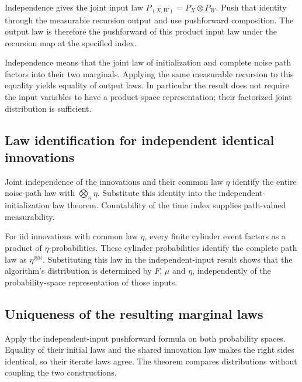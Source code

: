 \documentclass[11pt,a4paper]{report}
\begin{document}
Independence gives the joint input law \(P_{(X,W)}=P_X\otimes P_W\). Push that identity through the measurable recursion output and use pushforward composition. The output law is therefore the pushforward of this product input law under the recursion map at the specified index.



Independence means that the joint law of initialization and complete noise path factors into their two marginals. Applying the same measurable recursion to this equality yields equality of output laws. In particular the result does not require the input variables to have a product-space representation; their factorized joint distribution is sufficient.

\subsection{\texorpdfstring{Law identification for independent identical innovations}{Law identification for independent identical innovations}}
\label{report-step-UnadjustedLangevin-ChainLaw-lean-8}


Joint independence of the innovations and their common law \(\eta\) identify the entire noise-path law with \(\bigotimes_n\eta\). Substitute this identity into the independent-initialization law theorem. Countability of the time index supplies path-valued measurability.



For iid innovations with common law \(\eta\), every finite cylinder event factors as a product of \(\eta\)-probabilities. These cylinder probabilities identify the complete path law as \(\eta^{\otimes\mathbb N}\). Substituting this law in the independent-input result shows that the algorithm's distribution is determined by \(F\), \(\mu\) and \(\eta\), independently of the probability-space representation of those inputs.

\subsection{\texorpdfstring{Uniqueness of the resulting marginal laws}{Uniqueness of the resulting marginal laws}}
\label{report-step-UnadjustedLangevin-ChainLaw-lean-9}


Apply the independent-input pushforward formula on both probability spaces. Equality of their initial laws and the shared innovation law makes the right sides identical, so their iterate laws agree. The theorem compares distributions without coupling the two constructions.
\end{document}
